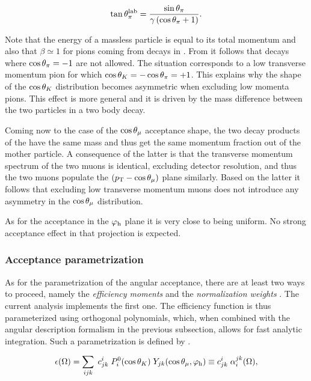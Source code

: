 \begin{equation}
  \centering
  \tan\thetapi^\lab = \frac{\sin\thetapi}{\gamma\parenthesis{\cos\thetapi + 1} }.
  \label{pi_angle_massless}
\end{equation}

\noindent Note that the energy of a massless particle is equal to its total momentum and also that $\beta \simeq 1$
for pions coming from \BJpsiKpi decays in \lhcb. From  it follows that decays where $\cos\theta_{\pi}=-1$
are not allowed. The situation corresponds to a low transverse momentum pion for which $\cos\theta_{K} = -\cos\theta_{\pi} = +1$.
This explains why the shape of the $\cos\theta_{K}$ distribution becomes asymmetric when excluding low momenta pions.
This effect is more general and it is driven by the mass difference between the two particles in a two body decay.

Coming now to the case of the $\cos\theta_{\mu}$ acceptance shape, the two decay products of the \jpsi have
the same mass and thus get the same momentum fraction out of the mother \jpsi particle. A consequence of
the latter is that the transverse momentum spectrum of the two muons is identical, excluding detector
resolution, and thus the two muons populate the $(\mbox{$p_{\rm T}$}-\cos\theta_{\mu})$ plane similarly. Based on the latter
it follows that excluding low transverse momentum muons does not introduce any asymmetry in the $\cos\theta_{\mu}$ distribution.

As for the acceptance in the $\varphi_{\text h}$ plane it is very close to being uniform.
No strong acceptance effect in that projection is expected.

\subsubsection{Acceptance parametrization}
\label{Acceptance parametrization}
As for the parametrization of the angular acceptance, there are at least two ways to proceed,
namely the \emph{efficiency moments} \cite{jeroenThesis} and the \emph{normalization weights} \cite{tristanThesis,jeroenThesis}.
The current analysis implements the first one. The efficiency function is thus parameterized using orthogonal polynomials,
which, when combined with the angular description formalism in the previous subsection, allows for fast analytic
integration. Such a parametrization is defined by .

\begin{equation}
  \centering
  \epsilon(\Omega) = \sum_{ijk} \; \moment{i}{j}{k} \; P_i^0(\cos\thetaK) \; Y_{jk}(\cos\thetamu,\phihel) \equiv \moment{i}{j}{k} \; \effbase,
  \label{eff_func}
\end{equation}

